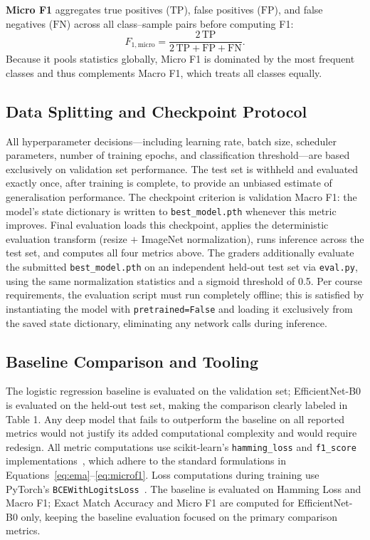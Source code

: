 \documentclass[10pt]{article}
\begin{document}
\textbf{Micro F1} aggregates true positives ($\mathrm{TP}$), false positives ($\mathrm{FP}$), and
false negatives ($\mathrm{FN}$) across all class--sample pairs before computing F1:
\begin{equation}
    F_{1,\text{micro}}
        = \frac{2\,\mathrm{TP}}{2\,\mathrm{TP} + \mathrm{FP} + \mathrm{FN}}.
    \label{eq:microf1}
\end{equation}
Because it pools statistics globally, Micro F1 is dominated by the most frequent classes and thus
complements Macro F1, which treats all classes equally.

\subsection*{Data Splitting and Checkpoint Protocol}

All hyperparameter decisions---including learning rate, batch size, scheduler parameters, number
of training epochs, and classification threshold---are based exclusively on validation set
performance.  The test set is withheld and evaluated exactly once, after training is complete, to
provide an unbiased estimate of generalisation performance.  The checkpoint criterion is
validation Macro F1: the model's state dictionary is written to \texttt{best\_model.pth} whenever
this metric improves.  Final evaluation loads this checkpoint, applies the deterministic
evaluation transform (resize $+$ ImageNet normalization), runs inference across the test set, and
computes all four metrics above.  The graders additionally evaluate the submitted
\texttt{best\_model.pth} on an independent held-out test set via \texttt{eval.py}, using the same
normalization statistics and a sigmoid threshold of 0.5.  Per course requirements, the evaluation
script must run completely offline; this is satisfied by instantiating the model with
\texttt{pretrained=False} and loading it exclusively from the saved state dictionary, eliminating
any network calls during inference.

\subsection*{Baseline Comparison and Tooling}

The logistic regression baseline is evaluated on the validation set; EfficientNet-B0 is evaluated 
on the held-out test set, making the comparison clearly labeled in Table 1.  Any deep model 
that fails to outperform the baseline on all reported metrics would not justify its added 
computational complexity and would require redesign.  All metric computations use scikit-learn's 
\texttt{hamming\_loss} and \texttt{f1\_score} implementations~\cite{pedregosa2011scikit}, which adhere 
to the standard formulations in Equations~\eqref{eq:ema}--\eqref{eq:microf1}.  Loss computations during 
training use PyTorch's \texttt{BCEWithLogitsLoss}~\cite{paszke2019pytorch}.  The baseline is evaluated on
Hamming Loss and Macro F1; Exact Match Accuracy and Micro F1 are computed for EfficientNet-B0
only, keeping the baseline evaluation focused on the primary comparison metrics.
\end{document}
